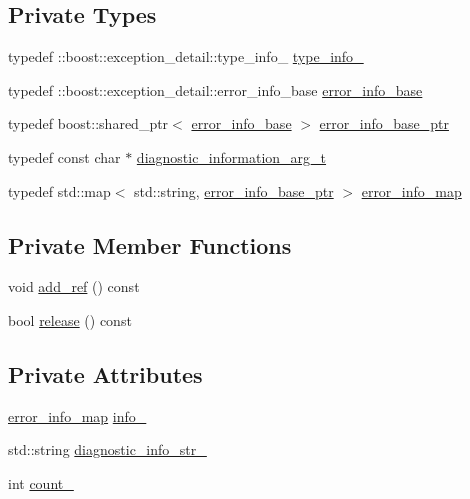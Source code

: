 \subsection*{Private Types}
\begin{DoxyCompactItemize}
\item 
typedef \+::boost\+::exception\+\_\+detail\+::type\+\_\+info\+\_\+ \hyperlink{classecto_1_1except_1_1error__info__container__impl_abe4f51bf533842a5e0b81f3e43ae6267}{type\+\_\+info\+\_\+}
\item 
typedef \+::boost\+::exception\+\_\+detail\+::error\+\_\+info\+\_\+base \hyperlink{classecto_1_1except_1_1error__info__container__impl_a90c2628bf7c5628003cd24fd369a77da}{error\+\_\+info\+\_\+base}
\item 
typedef boost\+::shared\+\_\+ptr$<$ \hyperlink{classecto_1_1except_1_1error__info__container__impl_a90c2628bf7c5628003cd24fd369a77da}{error\+\_\+info\+\_\+base} $>$ \hyperlink{classecto_1_1except_1_1error__info__container__impl_a9fbca0758380cb123f790aee77d1d4d8}{error\+\_\+info\+\_\+base\+\_\+ptr}
\item 
typedef const char $\ast$ \hyperlink{classecto_1_1except_1_1error__info__container__impl_a16f5ebd1abcacd60ddbd919ea166958e}{diagnostic\+\_\+information\+\_\+arg\+\_\+t}
\item 
typedef std\+::map$<$ std\+::string, \hyperlink{classecto_1_1except_1_1error__info__container__impl_a9fbca0758380cb123f790aee77d1d4d8}{error\+\_\+info\+\_\+base\+\_\+ptr} $>$ \hyperlink{classecto_1_1except_1_1error__info__container__impl_a20b3846bc393224fe282eb64a40ee83d}{error\+\_\+info\+\_\+map}
\end{DoxyCompactItemize}
\subsection*{Private Member Functions}
\begin{DoxyCompactItemize}
\item 
void \hyperlink{classecto_1_1except_1_1error__info__container__impl_ae931c5c31454852cdf3d1a84d1d588eb}{add\+\_\+ref} () const 
\item 
bool \hyperlink{classecto_1_1except_1_1error__info__container__impl_a59b8d31c21da10236de67f0a5bfdf4dd}{release} () const 
\end{DoxyCompactItemize}
\subsection*{Private Attributes}
\begin{DoxyCompactItemize}
\item 
\hyperlink{classecto_1_1except_1_1error__info__container__impl_a20b3846bc393224fe282eb64a40ee83d}{error\+\_\+info\+\_\+map} \hyperlink{classecto_1_1except_1_1error__info__container__impl_a8ec60b174805696bd691a894b7f4109f}{info\+\_\+}
\item 
std\+::string \hyperlink{classecto_1_1except_1_1error__info__container__impl_aeb86496a5127e19e9f787e77531b1b83}{diagnostic\+\_\+info\+\_\+str\+\_\+}
\item 
int \hyperlink{classecto_1_1except_1_1error__info__container__impl_ade4abdc4aa11c62dd39847bc4f6c619c}{count\+\_\+}
\end{DoxyCompactItemize}
